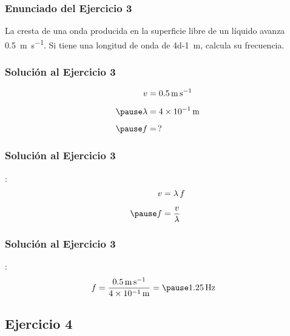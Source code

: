 \documentclass[14pt]{beamer}
\begin{document}
\begin{frame}
\frametitle{Enunciado del Ejercicio 3}
La cresta de una onda producida en la superficie libre de un líquido avanza \SI{0.5}{\meter\per\second}. Si tiene una longitud de onda de \SI{4d-1}{\meter}, \pause calcula su frecuencia.
\end{frame}
\begin{frame}
\frametitle{Solución al Ejercicio 3}
\pause
\begin{eqnarray*}
\begin{aligned}
v &= \SI{0.5}{\meter\per\second} \\[0.5em] \pause
\lambda &= \SI{4d-1}{\meter} \\[0.5em] \pause
f &= \, ?
\end{aligned}
\end{eqnarray*}
\end{frame}
\begin{frame}
\frametitle{Solución al Ejercicio 3}
:
\pause
\begin{eqnarray*}
\begin{aligned}
v &= \lambda \, f \\[0.5em] \pause
f &= \dfrac{v}{\lambda}
\end{aligned}
\end{eqnarray*}
\end{frame}
\begin{frame}
\frametitle{Solución al Ejercicio 3}
:
\pause
\begin{eqnarray*}
\begin{aligned}
f &= \dfrac{\SI{0.5}{\meter\per\second}}{\SI{4d-1}{\meter}} = \pause \SI{1.25}{\hertz}
\end{aligned}
\end{eqnarray*}
\end{frame}

\subsection{Ejercicio 4}
\end{document}
